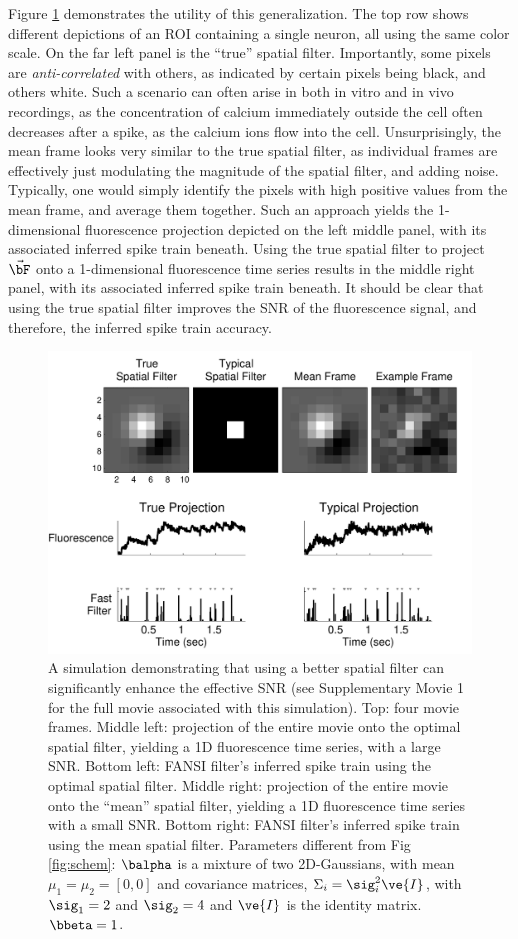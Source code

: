 Figure \ref{fig:spatial} demonstrates the utility of this generalization.  The top row shows different depictions of an ROI containing a single neuron, all using the same color scale.  On the far left panel is the ``true'' spatial filter.  Importantly, some pixels are \emph{anti-correlated} with others, as indicated by certain pixels being black, and others white.  Such a scenario can often arise in both in vitro and in vivo recordings, as the concentration of calcium immediately outside the cell often decreases after a spike, as the calcium ions flow into the cell.  Unsurprisingly, the mean frame looks very similar to the true spatial filter, as individual frames are effectively just modulating the magnitude of the spatial filter, and adding noise.  Typically, one would simply identify the pixels with high positive values from the mean frame, and average them together.  Such an approach yields the 1-dimensional fluorescence projection depicted on the left middle panel, with its associated inferred spike train beneath.  Using the true spatial filter to project $\vec{\bF}$ onto a 1-dimensional fluorescence time series results in the middle right panel, with its associated inferred spike train beneath.  It should be clear that using the true spatial filter improves the SNR of the fluorescence signal, and therefore, the inferred spike train accuracy.

\begin{figure}[H]
\centering \includegraphics[width=.9\linewidth]{../figs/spatial}
\caption{A simulation demonstrating that using a better spatial filter can significantly enhance the effective SNR (see Supplementary Movie 1 for the full movie associated with this simulation).  Top: four movie frames.  Middle left: projection of the entire movie onto the optimal spatial filter, yielding a 1D fluorescence time series, with a large SNR. Bottom left: FANSI filter's inferred spike train using the optimal spatial filter.  Middle right: projection of the entire movie onto the ``mean'' spatial filter, yielding a 1D fluorescence time series with a small SNR. Bottom right: FANSI filter's inferred spike train using the mean spatial filter. Parameters different from Fig \ref{fig:schem}: $\balpha$ is a mixture of two 2D-Gaussians, with mean $\mu_1=\mu_2=[0, 0]$ and covariance matrices, $\Sigma_i=\sig_i^2 \ve{I}$, with $\sig_1=2$ and $\sig_2=4$ and $\ve{I}$ is the identity matrix. $\bbeta=1$.} \label{fig:spatial} \end{figure} 